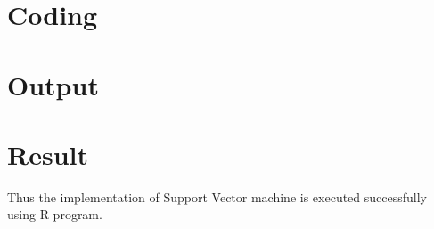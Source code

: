 \documentclass[a4paper,10pt]{article}
\begin{document}
\section{Coding}


\section{Output} 



\section{Result}
Thus the implementation of Support Vector machine is executed successfully using R program.
\end{document}
